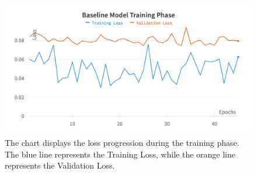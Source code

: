 \begin{figure}[H]
	\centering
	\includegraphics[width=\textwidth]{chapters/3_models/imgs/ufnc/ufnctraining.png}
	\caption{The chart displays the loss progression during the training phase. The blue line represents the Training Loss, while the orange line represents the Validation Loss.}
	\label{fig:ufcntraining}
\end{figure}

